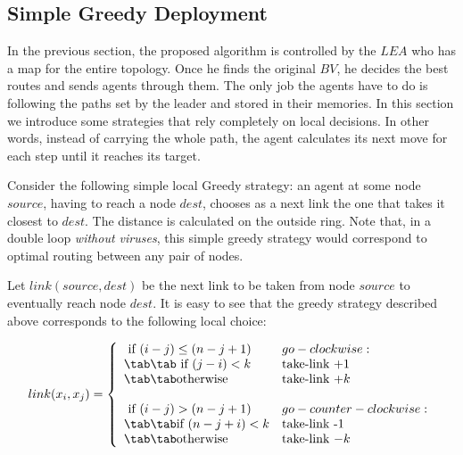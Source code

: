 \subsection{Simple Greedy Deployment}
 
In the previous section, the proposed algorithm is controlled by the $LEA$ who has a map for the entire topology. Once he finds the original $BV$, he decides the best routes and sends agents through them. The only job the agents have to do is following the paths set by the leader and stored in their memories. In this section we introduce some strategies that rely completely on local decisions. 
In other words, instead of carrying the whole path, the agent calculates its next move for each step until it reaches its target. 

Consider  the following simple local Greedy strategy: an agent at some node $source$, having to reach a node $dest$, chooses as a  next link the one that takes it closest to $dest$. The distance is calculated on the outside ring.
Note that, in a double loop {\em without viruses}, this simple greedy strategy  would correspond to optimal routing  
 between any pair of nodes. 



Let $link(source, dest)$ be the next link to be taken from node $source$ to eventually reach node $dest$.
It  is easy to see that the   greedy strategy described above corresponds to the following local choice:  %

\[
 link(x_i,x_j)  =    \left\{ \begin{array}{ll}
          \mbox{ if  $(i-j)\leq (n-j+1)$ }  &  go-clockwise:  \\
          \tab    \tab  \mbox  { if  $ (j-i)  <  k  $}   & \mbox  {take-link  +1}\\
                    \tab    \tab  \mbox  {otherwise}   & \mbox   {take-link  $+k $}\\

          \ \\
          \mbox{ if  $(i-j)> (n-j+1)$ }  &  go-counter-clockwise:  \\
          \tab   \tab \mbox  {if  $ (n-j+i)  <  k  $} &  \mbox  {take-link  -1}\\
                    \tab    \tab  \mbox  {otherwise}   & \mbox   {take-link  $-k $}\\
                          \end{array} \right. \] 
        
